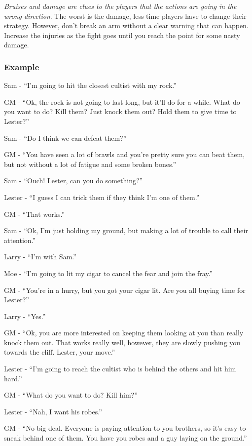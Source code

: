 \documentclass[11pt]{article}
\begin{document}
\textit{Bruises and damage are clues to the players that the actions are going in the wrong direction}. The worst is the damage, less time players have to change their strategy. However, don't break an arm without a clear warning that can happen. Increase the injuries as the fight goes until you reach the point for some nasty damage.

\subsubsection{Example}
\label{sec:org0a9b144}

Sam - \enquote{I'm going to hit the closest cultist with my rock.}

GM - \enquote{Ok, the rock is not going to last long, but it'll do for a while. What do you want to do? Kill them? Just knock them out? Hold them to give time to Lester?}

Sam - \enquote{Do I think we can defeat them?}

GM - \enquote{You have seen a lot of brawls and you're pretty sure you can beat them, but not without a lot of fatigue and some broken bones.}

Sam - \enquote{Ouch! Lester, can you do something?}

Lester - \enquote{I guess I can trick them if they think I'm one of them.}

GM - \enquote{That works.}

Sam - \enquote{Ok, I'm just holding my ground, but making a lot of trouble to call their attention.}

Larry - \enquote{I'm with Sam.}

Moe - \enquote{I'm going to lit my cigar to cancel the fear and join the fray.}

GM - \enquote{You're in a hurry, but you got your cigar lit. Are you all buying time for Lester?}

Larry - \enquote{Yes.}

GM - \enquote{Ok, you are more interested on keeping them looking at you than really knock them out. That works really well, however, they are slowly pushing you towards the cliff. Lester, your move.}

Lester - \enquote{I'm going to reach the cultist who is behind the others and hit him hard.}

GM - \enquote{What do you want to do? Kill him?}

Lester - \enquote{Nah, I want his robes.}

GM - \enquote{No big deal. Everyone is paying attention to you brothers, so it's easy to sneak behind one of them. You have you robes and a guy laying on the ground.}
\end{document}

